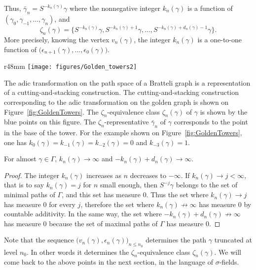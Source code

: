 \documentclass[12pt,a4paper]{article}
\begin{document}
Thus, $\boxed{\bar\gamma_n = S^{-k_n(\gamma)}\gamma}$ where the nonnegative integer $k_n(\gamma)$ 
is a function of $(\gamma_{0}, \gamma_{-1}, \ldots, \gamma_n)$, and 
$$
\zeta_n(\gamma) = \{S^{-k_n(\gamma)}\gamma, S^{-k_n(\gamma)+1}\gamma, 
\ldots, S^{-k_n(\gamma)+d_n(\gamma)-1}\gamma \}.
$$ 
More precisely, knowing the vertex $v_n(\gamma)$, the integer $k_n(\gamma)$ is 
a one-to-one function of $\bigl(\epsilon_{n+1}(\gamma), \ldots, \epsilon_0(\gamma)\bigr)$. 


\begin{wrapfigure}{r}{48mm}
   \centering
   	\texttt{[image: figures/Golden\_towers2]}
   \caption{Golden towers}
   \label{fig:GoldenTowers}
\end{wrapfigure}
The adic transformation on the path space of a Bratteli graph is 
a representation of a cutting-and-stacking construction. 
The cutting-and-stacking construction corresponding to 
the adic transformation on the golden graph is shown on
Figure~\ref{fig:GoldenTowers}. 
The $\zeta_n$-equivalence class $\zeta_n(\gamma)$ of 
$\gamma$ is shown by the blue points on this figure. 
The $\zeta_n$-representative $\bar\gamma_n$ of $\gamma$ 
corresponds to the point in the base of the tower. 
For the example shown on Figure~\ref{fig:GoldenTowers}, 
one has $k_0(\gamma)=k_{-1}(\gamma)=k_{-2}(\gamma)=0$ 
and $k_{-3}(\gamma)=1$. 




\begin{lemma}\label{lemma:infinitelimits}
For almost $\gamma \in \Gamma$, 
$k_n(\gamma) \to \infty$ and $-k_n(\gamma)+d_n(\gamma) \to \infty$.
\end{lemma}

\begin{proof}
The integer $k_n(\gamma)$ increases as $n$ decreases to $-\infty$. 
If $k_n(\gamma) \to j < \infty$, that is to say $k_n(\gamma)=j$ for $n$ small 
enough, then $S^{-j}\gamma$ belongs to the set of minimal paths 
of $\Gamma$, and this set has measure $0$. 
Thus the set where $k_n(\gamma) \to j$ has measure $0$ for every $j$, 
therefore the set where $k_n(\gamma) \not\to \infty$ has measure $0$ 
by countable additivity. 
In the same way, the set where $-k_n(\gamma)+d_n(\gamma) \not\to \infty$ 
has measure $0$ because the set of maximal paths of $\Gamma$ has measure $0$.
\end{proof}

 
Note that the sequence $\bigl(v_n(\gamma), \epsilon_n(\gamma)\bigr)_{n \leq n_0}$  
 determines the path $\gamma$ truncated at level $n_0$. 
In other words it determines the $\zeta_{n}$-equivalence class  
$\zeta_n(\gamma)$. 
We will come back to the above points in the next section, in the 
language of $\sigma$-fields. 
\end{document}
